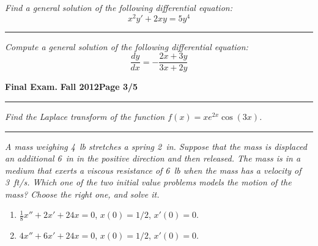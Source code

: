 \documentclass[12pt]{article}
\begin{document}
\bigskip
{\problem[20 pts] \em Find a general solution of the following differential equation:}
\begin{equation*}
x^2y' + 2xy = 5y^4
\end{equation*}
\vspace{10cm}
\begin{flushright}
\end{flushright}
\hrule
{\problem[15pts] \em Compute a general solution of the following differential equation:}
\begin{equation*}
\frac{dy}{dx} = -\frac{2x+3y}{3x+2y}
\end{equation*}
\vspace{5cm}
\begin{flushright}
\end{flushright}

\newpage
\hfill{\large\bf Final Exam.}\hfill{\large\bf
  Fall 2012}\hfill{\large\bf Page 3/5}\hrule

\bigskip
{\problem[10pts] \em Find the Laplace transform of the function
$f(x)=xe^{2x}\cos(3x)$.}
\vspace{4cm}
\begin{flushright}
\end{flushright}
\hrule
{\problem[30pts] \em A mass weighing 4~lb stretches a spring 2~in.  Suppose
that the mass is displaced an additional 6~in in the positive direction and
then released.  The mass is in a medium that exerts a viscous resistance of
6~lb when the mass has a velocity of 3~ft/s.  Which one of the two initial
value problems models the motion of the mass?  Choose the right one, and
solve it.}
\begin{enumerate}
\item $\frac{1}{8} x'' + 2x' + 24x=0$, $x(0)=1/2$, $x'(0)=0$.
\item $4x'' + 6x' + 24x =0$, $x(0)=1/2$, $x'(0)=0$.
\end{enumerate}

\vspace{11cm}
\begin{flushright}
\end{flushright}
\newpage
\end{document}
